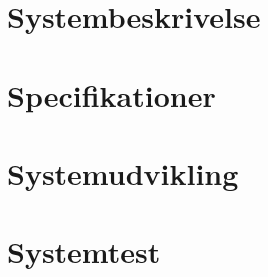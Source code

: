 



\frontmatter
% 
\cleardoublepage
%
%

\mainmatter
\cleardoublepage
\tableofcontents
\clearpage

%



\chapter{Systembeskrivelse}






\chapter{Specifikationer}


\chapter{Systemudvikling}






\chapter{Systemtest}



\clearpage



\appendix
\appendixtocname
\addappheadtotoc


